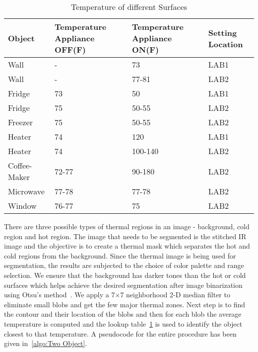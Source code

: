 \begin{table}[h!]
\centering
 \begin{tabular}{||p{1.3cm} | p{2cm} | p{2cm} | p{1cm}||}
 \hline
 Object & Temperature Appliance OFF(F) & Temperature Appliance ON(F) & Setting Location\\ [0.5ex]
 \hline\hline
 Wall  & - & 73 & LAB1\\
  \hline\hline
 Wall  & - & 77-81 & LAB2\\
  \hline
 Fridge & 73 & 50 & LAB1 \\
 \hline
 Fridge & 75  & 50-55 & LAB2 \\
 \hline 
 Freezer & 75  & 50-55 & LAB2 \\
 \hline
 Heater & 74 & 120 &  LAB1\\ 
 \hline
  Heater & 74 & 100-140 &  LAB2\\ 
 \hline
 Coffee-Maker & 72-77 & 90-180 &  LAB2\\
 \hline
 Microwave & 77-78 & 77-78 & LAB2\\
 \hline
 Window & 76-77 & 75 & LAB2\\ [1ex]
 \hline
 \end{tabular}
 \label{table:temp}
\caption{Temperature of different Surfaces}
\end{table}


 \indent There are three possible types of thermal regions in an image - background, cold region and hot region. The image that needs to be segmented is the stitched IR image and the objective is to create a thermal mask which separates the hot and cold regions from the background. Since the thermal image is being used for segmentation, the results are subjected to the choice of color palette and range selection.  We ensure that the background has darker tones than the hot or cold surfaces which helps achieve the desired segmentation after image binarization using Otsu's method~\cite{Otsu}. We apply a 7$\times$7 neighborhood 2-D median filter to eliminate small blobs and get the few major thermal zones. Next step is to find the contour and their location of the blobs and then for each blob the average temperature is computed and the lookup table~\ref{table:temp} is used to identify the object closest to that temperature. A pseudocode for the entire procedure has been given in~\ref{algo:Two Object}.
 
